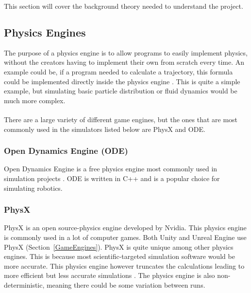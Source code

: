 This section will cover the background theory needed to understand the project. 
\subsection{Physics Engines}
The purpose of a physics engine is to allow programs to easily implement physics, without the creators having to implement their own from scratch every time. An example could be, if a program needed to calculate a trajectory, this formula could be implemented directly inside the physics engine \cite{millington2007game}. This is quite a simple example, but simulating basic particle distribution or fluid dynamics would be much more complex. 
\\~\\
There are a large variety of different game engines, but the ones that are most commonly used in the simulators listed below are PhysX and ODE.

\subsubsection{Open Dynamics Engine (ODE)}
Open Dynamics Engine is a free physics engine most commonly used in simulation projects \cite{ODEPaper}. ODE is written in C++ and is a popular choice for simulating robotics. 

\subsubsection{PhysX}
PhysX is an open source-physics engine developed by Nvidia. This physics engine is commonly used in a lot of computer games. Both Unity and Unreal Engine use PhysX (Section~\ref{GameEngines}). PhysX is quite unique among other physics engines. This is because most scientific-targeted simulation software would be more accurate. This physics engine however truncates the calculations leading to more efficient but less accurate simulations \cite{Martinez-FrancoJuanC2018PAAM}. The physics engine is also non-deterministic, meaning there could be some variation between runs. 





